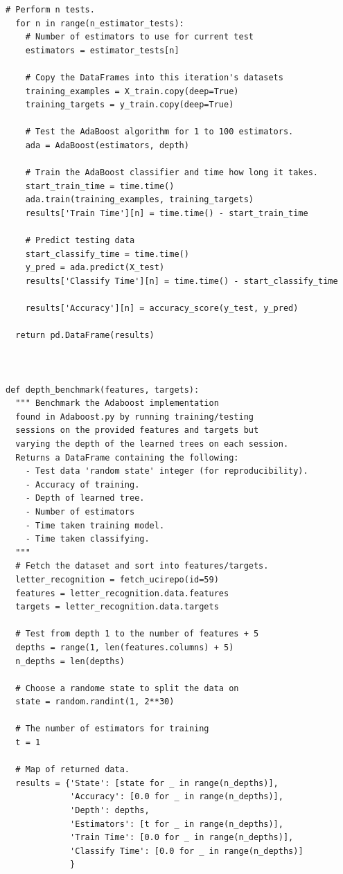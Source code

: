 \documentclass[a4paper]{article}
\begin{document}
\begin{lstlisting}[basicstyle= \scriptsize]
  # Perform n tests.
  for n in range(n_estimator_tests):
    # Number of estimators to use for current test
    estimators = estimator_tests[n]

    # Copy the DataFrames into this iteration's datasets
    training_examples = X_train.copy(deep=True)
    training_targets = y_train.copy(deep=True)

    # Test the AdaBoost algorithm for 1 to 100 estimators.
    ada = AdaBoost(estimators, depth) 

    # Train the AdaBoost classifier and time how long it takes.
    start_train_time = time.time()
    ada.train(training_examples, training_targets)
    results['Train Time'][n] = time.time() - start_train_time 

    # Predict testing data
    start_classify_time = time.time()
    y_pred = ada.predict(X_test)
    results['Classify Time'][n] = time.time() - start_classify_time

    results['Accuracy'][n] = accuracy_score(y_test, y_pred)

  return pd.DataFrame(results)



def depth_benchmark(features, targets):
  """ Benchmark the Adaboost implementation
  found in Adaboost.py by running training/testing
  sessions on the provided features and targets but
  varying the depth of the learned trees on each session.
  Returns a DataFrame containing the following:
    - Test data 'random state' integer (for reproducibility).
    - Accuracy of training.
    - Depth of learned tree.
    - Number of estimators
    - Time taken training model.
    - Time taken classifying.
  """
  # Fetch the dataset and sort into features/targets.
  letter_recognition = fetch_ucirepo(id=59) 
  features = letter_recognition.data.features
  targets = letter_recognition.data.targets

  # Test from depth 1 to the number of features + 5
  depths = range(1, len(features.columns) + 5)
  n_depths = len(depths)

  # Choose a randome state to split the data on
  state = random.randint(1, 2**30)

  # The number of estimators for training
  t = 1 

  # Map of returned data.
  results = {'State': [state for _ in range(n_depths)],
             'Accuracy': [0.0 for _ in range(n_depths)],
             'Depth': depths,
             'Estimators': [t for _ in range(n_depths)],
             'Train Time': [0.0 for _ in range(n_depths)],
             'Classify Time': [0.0 for _ in range(n_depths)]
             }
  

\end{lstlisting}
\end{document}
